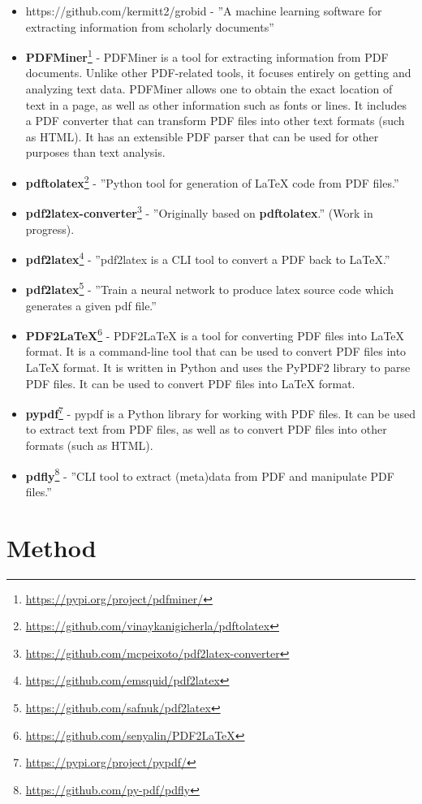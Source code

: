 \begin{itemize}
    \item https://github.com/kermitt2/grobid - ''A machine learning software for extracting information from scholarly documents''
    \item \textbf{PDFMiner}\footnote{\url{https://pypi.org/project/pdfminer/}} - PDFMiner is a tool for extracting information from PDF documents. Unlike other PDF-related tools, it focuses entirely on getting and analyzing text data. PDFMiner allows one to obtain the exact location of text in a page, as well as other information such as fonts or lines. It includes a PDF converter that can transform PDF files into other text formats (such as HTML). It has an extensible PDF parser that can be used for other purposes than text analysis.
    \item \textbf{pdftolatex}\footnote{\url{https://github.com/vinaykanigicherla/pdftolatex}} - ''Python tool for generation of \LaTeX{} code from PDF files.''
    \item \textbf{pdf2latex-converter}\footnote{\url{https://github.com/mcpeixoto/pdf2latex-converter}} - ''Originally based on \textbf{pdftolatex}.'' (Work in progress).
    \item \textbf{pdf2latex}\footnote{\url{https://github.com/emsquid/pdf2latex}} - ''pdf2latex is a CLI tool to convert a PDF back to LaTeX.''
    \item \textbf{pdf2latex}\footnote{\url{https://github.com/safnuk/pdf2latex}} - ''Train a neural network to produce latex source code which generates a given pdf file.''
    \item \textbf{PDF2LaTeX}\footnote{\url{https://github.com/senyalin/PDF2LaTeX}} - PDF2LaTeX is a tool for converting PDF files into \LaTeX{} format. It is a command-line tool that can be used to convert PDF files into \LaTeX{} format. It is written in Python and uses the PyPDF2 library to parse PDF files. It can be used to convert PDF files into \LaTeX{} format.
    \item \textbf{pypdf}\footnote{\url{https://pypi.org/project/pypdf/}} - pypdf is a Python library for working with PDF files. It can be used to extract text from PDF files, as well as to convert PDF files into other formats (such as HTML).
    \item \textbf{pdfly}\footnote{\url{https://github.com/py-pdf/pdfly}} - ''CLI tool to extract (meta)data from PDF and manipulate PDF files.''
\end{itemize}

\section{Method}

